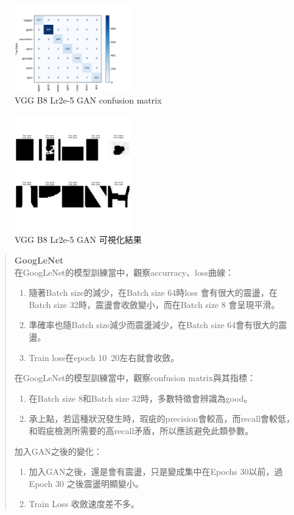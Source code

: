 \begin{figure}[htbp]
    \centering
    \includegraphics[width=0.45\textwidth]{./img/VGG/P9.png}
    \caption{VGG B8 Lr2e-5 GAN confusion matrix}
    \label{fig:VGG_P9}
\end{figure}
\begin{figure}[htbp]
    \centering
    \includegraphics[width=0.45\textwidth]{./img/VGG/P10.png}
    \caption{VGG B8 Lr2e-5 GAN 可視化結果}
    \label{fig:VGG_P10}
\end{figure}
%
\begin{abstract}
    \textbf{GoogLeNet}\\
    在GoogLeNet的模型訓練當中，觀察accurracy、loss曲線：
    \begin{enumerate}
        \item 隨著Batch size的減少，在Batch size 64時loss 會有很大的震盪，在Batch size 32時，震盪會收斂變小，而在Batch size 8 會呈現平滑。
        \item 準確率也隨Batch size減少而震盪減少，在Batch size 64會有很大的震盪。
        \item Train loss在epoch 10~20左右就會收斂。
    \end{enumerate}
    在GoogLeNet的模型訓練當中，觀察confusion matrix與其指標：
    \begin{enumerate}
        \item 在Batch size 8和Batch size 32時，多數特徵會辨識為good。
        \item 承上點，若這種狀況發生時，瑕疵的precision會較高，而recall會較低，和瑕疵檢測所需要的高recall矛盾，所以應該避免此類參數。
    \end{enumerate}
    加入GAN之後的變化：
    \begin{enumerate}
        \item 加入GAN之後，還是會有震盪，只是變成集中在Epochs 30以前，過Epoch 30 之後震盪明顯變小。
        \item Train Loss 收斂速度差不多。
    \end{enumerate}
\end{abstract}
